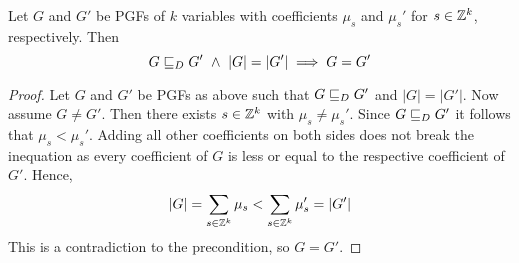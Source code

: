 \begin{lemma}
	\label{lem:leq_and_mass_impl_equality}
	Let $G$ and $G'$ be PGFs of $k$ variables with coefficients $\mu_s$ and $\mu_s'$ for $s \in \mathbb{Z}^k$, respectively. Then
	$$ G \sqsubseteq_{D} G' \ \land \ |G| = |G'| \implies G = G' $$
	\begin{proof}
		Let $G$ and $G'$ be PGFs as above such that $G \sqsubseteq_{D} G'$ and $|G| = |G'|$.
		Now assume $G \ne G'$.
		Then there exists $s \in \mathbb{Z}^k$ with $\mu_s \ne \mu_s'$.
		Since $G \sqsubseteq_{D} G'$ it follows that $\mu_s < \mu_s'$.
		Adding all other coefficients on both sides does not break the inequation as every coefficient of $G$ is less or equal to the respective coefficient of $G'$.
		Hence,
		\[ |G| = \sum_{s \in \mathbb{Z}^k} \mu_s < \sum_{s \in \mathbb{Z}^k} \mu_s' = |G'| \]
		This is a contradiction to the precondition, so $G = G'$.
	\end{proof}
\end{lemma}

